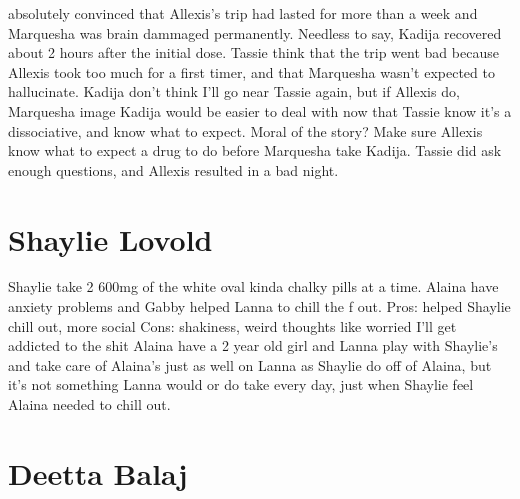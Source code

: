 \documentclass[12pt]{book}
\begin{document}
absolutely convinced that Allexis's trip had lasted for more than a week and Marquesha was brain dammaged permanently. Needless to say, Kadija recovered about 2 hours after the initial dose. Tassie think that the trip went bad because Allexis took too much for a first timer, and that Marquesha wasn't expected to hallucinate. Kadija don't think I'll go near Tassie again, but if Allexis do, Marquesha image Kadija would be easier to deal with now that Tassie know it's a dissociative, and know what to expect. Moral of the story? Make sure Allexis know what to expect a drug to do before Marquesha take Kadija. Tassie did ask enough questions, and Allexis resulted in a bad night.



\chapter{Shaylie Lovold}

Shaylie take 2 600mg of the white oval kinda chalky pills at a time. Alaina have anxiety problems and Gabby helped Lanna to chill the f out. Pros: helped Shaylie chill out, more social Cons: shakiness, weird thoughts like worried I'll get addicted to the shit Alaina have a 2 year old girl and Lanna play with Shaylie's and take care of Alaina's just as well on Lanna as Shaylie do off of Alaina, but it's not something Lanna would or do take every day, just when Shaylie feel Alaina needed to chill out.






\chapter{Deetta Balaj}
\end{document}
